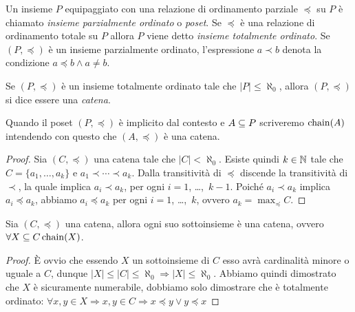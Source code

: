 \begin{definizione} 
Un insieme $P$ equipaggiato con una relazione di ordinamento
parziale $\preceq$ su $P$ \`e chiamato
\emph{insieme parzialmente ordinato} o \emph{poset}.
Se $\preceq$ \`e una relazione di
ordinamento totale su $P$ allora $P$ viene detto
\emph{insieme totalmente ordinato}.
Se $(P, \preceq)$ \`e un insieme parzialmente ordinato,
l'espressione $a \prec b$ denota
la condizione $a \preceq b \land a \neq b$.
\end{definizione}

\begin{definizione} 
Se $(P, \preceq)$ \`e un insieme totalmente ordinato
tale che $|P| \leq \aleph _0$, allora $(P, \preceq)$ si dice essere una
\emph{catena}.
\end{definizione}

Quando il poset $(P, \preceq)$ \`e implicito dal contesto
e $A \subseteq P$ scriveremo $\mathop{\mathrm{chain}}\nolimits(A)$ intendendo con questo
che $(A, \preceq)$ \`e una catena.

\begin{proposizione}
\label{prop:catena-finita-ha-elemento-massimo}
\end{proposizione}
\begin{proof}
Sia $(C, \preceq)$ una catena tale che $|C| < \aleph_0$.
Esiste quindi $k \in \mathbb{N}$ tale che $C = \{ a_1, \dots, a_k \}$
e $a_1 \prec \cdots \prec a_k$.
Dalla transitivit\`a di $\preceq$ discende la transitivit\`a di $\prec$,
la quale implica $a_i \prec a_k$, per ogni $i = 1$, \dots,~$k-1$.
Poich\'e $a_i \prec a_k$ implica $a_i \preceq a_k$, abbiamo
$a_i \preceq a_k$ per ogni $i = 1$, \dots,~$k$, ovvero $a_k = \max_\preceq C$.
\end{proof}


\begin{proposizione} 
Sia $(C, \preceq)$ una catena, allora ogni suo sottoinsieme è una catena, ovvero $\forall X \subseteq C \mathop{\mathrm{chain}}\nolimits(X)$.
\end{proposizione}
\begin{proof}
È ovvio che essendo $X$ un sottoinsieme di $C$ esso avrà cardinalità minore o uguale a $C$, dunque $|X| \leq |C| \leq \aleph_0 \Rightarrow |X| \leq \aleph_0$. Abbiamo quindi dimostrato che $X$ è sicuramente numerabile, dobbiamo solo dimostrare che è totalmente ordinato:
$\forall x,y \in X \Rightarrow x,y \in C \Rightarrow x \preceq y \lor y \preceq x$
\end{proof}

